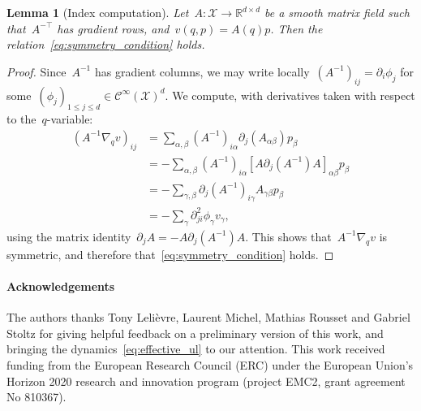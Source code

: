 \documentclass[10pt]{article}
\newcommand{\R}{\mathbb{R}}
\newcommand{\cX}{\mathcal{X}}
\newcommand{\1}{\mathbbm 1}
\newtheorem{lemma}{Lemma}
\begin{document}
\begin{lemma}[Index computation]
    \label{lemma:commutation}
    Let~$A:\cX\to\R^{d\times d}$ be a smooth matrix field such that~$A^{-\top}$ has gradient rows, and~$v(q,p)=A(q)p$. Then the relation~\eqref{eq:symmetry_condition} holds.
\end{lemma}
\begin{proof}
    Since~$A^{-1}$ has gradient columns, we may write locally~$(A^{-1})_{ij} = \partial_i \phi_j$ for some~${(\phi_j)_{1\leq j\leq d}\in\mathcal C^\infty(\cX)^d}$.
    We compute, with derivatives taken with respect to the~$q$-variable:
    \begin{equation}
        \begin{aligned}
            (A^{-1}\nabla_q v)_{ij} &= \sum_{\alpha,\beta} (A^{-1})_{i\alpha}\partial_j(A_{\alpha\beta})p_\beta\\
            &=-\sum_{\alpha,\beta}(A^{-1})_{i\alpha}\left[A\partial_j(A^{-1})A\right]_{\alpha\beta}p_\beta\\
            &=-\sum_{\gamma,\beta}\partial_j(A^{-1})_{i\gamma}A_{\gamma\beta}p_\beta\\
            &=-\sum_{\gamma}\partial^2_{ji}\phi_\gamma v_\gamma,
        \end{aligned}
    \end{equation}
    using the matrix identity~$\partial_j A = -A\partial_j(A^{-1})A$. This shows that~$A^{-1}\nabla_q v$ is symmetric, and therefore that~\eqref{eq:symmetry_condition} holds.
\end{proof}

\paragraph{Acknowledgements}
The authors thanks Tony Leli\`evre, Laurent Michel, Mathias Rousset and Gabriel Stoltz for giving helpful feedback on a preliminary version of this work, and bringing the dynamics~\eqref{eq:effective_ul} to our attention.
 This work received funding from the European Research Council (ERC) under the
    European Union's Horizon 2020 research and innovation program (project
    EMC2, grant agreement No 810367).



\end{document}
